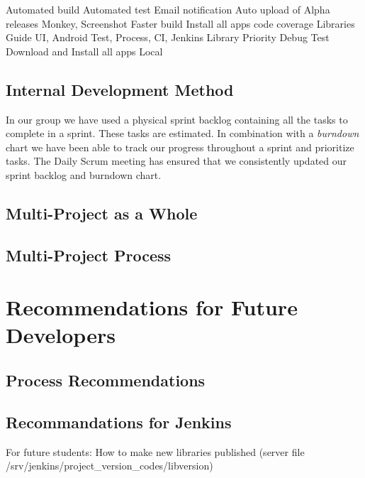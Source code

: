 Automated build
Automated test
Email notification
Auto upload of Alpha releases
Monkey, Screenshot
Faster build
Install all apps
code coverage
Libraries
Guide UI, Android Test, Process, CI, Jenkins
Library Priority
Debug Test
Download and Install all apps Local


\section{Internal Development Method}\label{conc:internalprocess}
In our group we have used a physical sprint backlog containing all the tasks to complete in a sprint. These tasks are estimated. In combination with a \emph{burndown} chart we have been able to track our progress throughout a sprint and prioritize tasks. The Daily Scrum meeting has ensured that we consistently updated our sprint backlog and burndown chart.

\section{Multi-Project as a Whole}\label{conc:multi_project_eval}

\section{Multi-Project Process}\label{conc:multi_project_process_eval}

\chapter{Recommendations for Future Developers}\label{chap:future_dev_recommendations}


\section{Process Recommendations}

\section{Recommandations for Jenkins}
For future students: How to make new libraries published (server file /srv/jenkins/project\_version\_codes/libversion)
